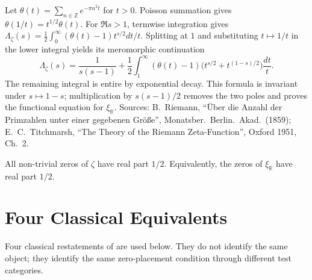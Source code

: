 \begin{remark}
\label{v4-arith:w5-direct:rem:Poisson}
Let $\theta(t)=\sum_{n\in\mathbb Z}e^{-\pi n^2t}$ for $t>0$.
Poisson summation gives $\theta(1/t)=t^{1/2}\theta(t)$.
For $\Re s>1$, termwise integration gives
$\Lambda_\zeta(s)=\frac12\int_0^\infty(\theta(t)-1)t^{s/2}dt/t$.
Splitting at $1$ and substituting $t\mapsto1/t$ in the lower
integral yields its meromorphic continuation
\[
 \Lambda_\zeta(s)=\frac1{s(s-1)}+
 \frac12\int_1^\infty(\theta(t)-1)
       \bigl(t^{s/2}+t^{(1-s)/2}\bigr)\frac{dt}{t}.
\]
The remaining integral is entire by exponential decay. This formula
is invariant under $s\mapsto1-s$; multiplication by $s(s-1)/2$
removes the two poles and proves the functional equation for
$\xi_{\mathbb R}$.
Sources: B.~Riemann, ``\"{U}ber die Anzahl der Primzahlen unter einer gegebenen Gr\"{o}\ss e'', Monatsber.~Berlin.~Akad.~(1859); E.~C.~Titchmarsh, ``The Theory of the Riemann Zeta-Function'', Oxford 1951, Ch.~2.
\end{remark}

\begin{conjecture}
\label{v4-arith:w5-direct:conj:RH}
All non-trivial zeros of \(\zeta\) have real part \(1/2\). Equivalently,
the zeros of \(\xi_{\mathbb{R}}\) have real part \(1/2\).
\end{conjecture}

\section{Four Classical Equivalents}
\label{v4-arith:w5-direct:four-equivalents}

Four classical restatements of
 are used below.  They do not
identify the same object; they identify the same zero-placement
condition through different test categories.


